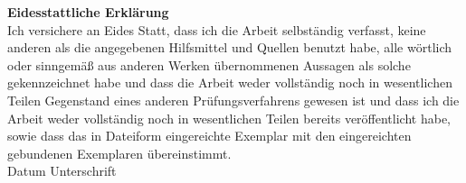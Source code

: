 \clearpage

\vspace*{3cm}

\begin{center}
    \begin{minipage}{0.8\textwidth}
        \textbf{\large{Eidesstattliche Erklärung}}\\[1cm]
    
        Ich versichere an Eides Statt, dass ich die Arbeit selbständig verfasst, keine anderen als die angegebenen Hilfsmittel und Quellen benutzt habe, alle wörtlich oder sinngemäß aus anderen Werken übernommenen Aussagen als solche gekennzeichnet habe und dass die Arbeit weder vollständig noch in wesentlichen Teilen Gegenstand eines anderen Prüfungsverfahrens gewesen ist und dass ich die Arbeit weder vollständig noch in wesentlichen Teilen bereits veröffentlicht habe, sowie dass das in Dateiform eingereichte Exemplar mit den eingereichten gebundenen Exemplaren übereinstimmt.\\[1,5cm]

        Datum \hfill Unterschrift
    \end{minipage}
\end{center}


\thispagestyle{empty}

\newpage